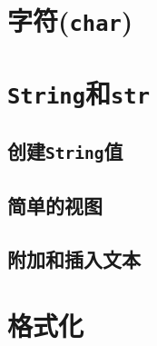 \section{字符(\texttt{char})}

\section{\texttt{String}和\texttt{str}}

\subsection{创建\texttt{String}值}

\subsection{简单的视图}

\subsection{附加和插入文本}\label{AppendText}

\section{格式化}\label{format}